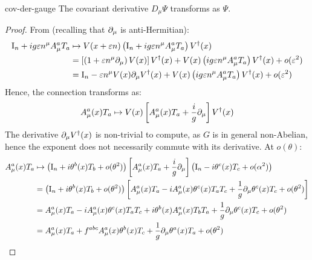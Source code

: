 \begin{proposition}{}{cov-der-gauge}
  The covariant derivative $ D_\mu \Psi $ transforms as $ \Psi $.
\end{proposition}

\begin{proofbox}
  \begin{proof}
    From  (recalling that $ \partial_\mu $ is anti-Hermitian):
    \begin{equation*}
      \begin{split}
        \mathrm{I}_n + i g \varepsilon n^\mu A_\mu^a T_a
        & \mapsto V(x + \varepsilon n) \left( \mathrm{I}_n + i g \varepsilon n^\mu A_\mu^a T_a \right) V^\dagger(x) \\
        & = \left[ \left( 1 + \varepsilon n^\mu \partial_\mu \right) V(x) \right] V^\dagger(x) + V(x) \left( i g \varepsilon n^\mu A_\mu^a T_a \right) V^\dagger(x) + o(\varepsilon^2) \\
        & = \mathrm{I}_n - \varepsilon n^\mu V(x) \partial_\mu V^\dagger(x) + V(x) \left( i g \varepsilon n^\mu A_\mu^a T_a \right) V^\dagger(x) + o(\varepsilon^2)
      \end{split}
    \end{equation*}
    Hence, the connection transforms as:
    \begin{equation*}
      A_\mu^a(x) T_a \mapsto V(x) \left[ A_\mu^a(x) T_a + \frac{i}{g} \partial_\mu \right] V^\dagger(x)
    \end{equation*}
    The derivative $ \partial_\mu V^\dagger(x) $ is non-trivial to compute, as $ G $ is in general non-Abelian, hence the exponent does not necessarily commute with its derivative. At $ o(\theta) $:
    \begin{equation*}
      \begin{split}
        A_\mu^a(x) T_a
        & \mapsto \left( \tens{I}_n + i \theta^b(x) T_b + o(\theta^2) \right) \left[ A_\mu^a(x) T_a + \frac{i}{g} \pa_\mu \right] \left( \tens{I}_n - i \theta^c(x) T_c + o(\alpha^2) \right) \\
        & = \left( \tens{I}_n + i \theta^b(x) T_b + o(\theta^2) \right) \left[ A_\mu^a(x) T_a - i A_\mu^a(x) \theta^c(x) T_a T_c + \frac{1}{g} \pa_\mu \theta^c(x) T_c + o(\theta^2) \right] \\
        & = A_\mu^a(x) T_a - i A_\mu^a(x) \theta^c(x) T_a T_c + i \theta^b(x) A_\mu^a(x) T_b T_a + \frac{1}{g} \pa_\mu \theta^c(x) T_c + o(\theta^2) \\
        & = A_\mu^a(x) T_a + f^{abc} A_\mu^a(x) \theta^b(x) T_c + \frac{1}{g} \pa_\mu \theta^a(x) T_a + o(\theta^2)

\end{split}
\end{equation*}
\end{proof}
\end{proofbox}
